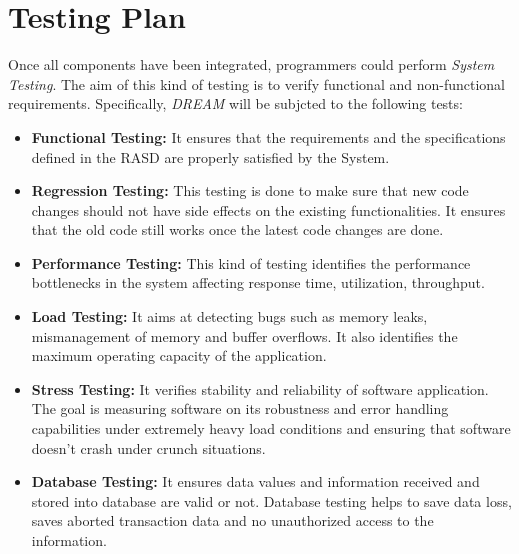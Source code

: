 \section{Testing Plan}

Once all components have been integrated, programmers could perform \textit{System Testing}.
The aim of this kind of testing is to verify functional and non-functional requirements.
Specifically, \textit{DREAM} will be subjcted to the following tests:

\begin{itemize}
    \item \textbf{Functional Testing:} It ensures that the requirements and the specifications defined in the RASD are properly satisfied by the System. 
    \item \textbf{Regression Testing:} This testing is done to make sure that new code changes should not have side effects on the existing functionalities. It ensures that the old code still works once the latest code changes are done.
    \item \textbf{Performance Testing:} This kind of testing identifies the performance bottlenecks in the system affecting response time, utilization, throughput.
    \item \textbf{Load Testing:} It aims at detecting bugs such as memory leaks, mismanagement of memory and buffer overflows. It also identifies the maximum operating capacity of the application.
    \item \textbf{Stress Testing:} It verifies stability and reliability of software application. The goal is measuring software on its robustness and error handling capabilities under extremely heavy load conditions and ensuring that software doesn't crash under crunch situations.
    \item \textbf{Database Testing:} It ensures data values and information received and stored into database are valid or not. Database testing helps to save data loss, saves aborted transaction data and no unauthorized access to the information.
\end{itemize}